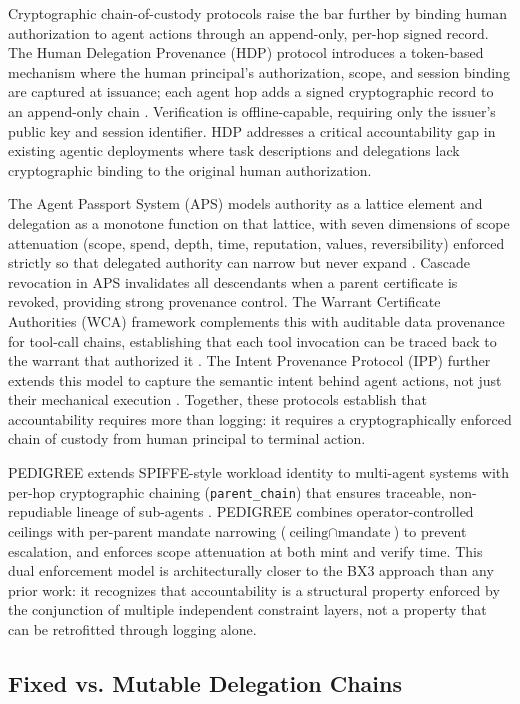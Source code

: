 Cryptographic chain-of-custody protocols raise the bar further by binding human authorization to agent actions through an append-only, per-hop signed record. The Human Delegation Provenance (HDP) protocol introduces a token-based mechanism where the human principal's authorization, scope, and session binding are captured at issuance; each agent hop adds a signed cryptographic record to an append-only chain \cite{hdp2026}. Verification is offline-capable, requiring only the issuer's public key and session identifier. HDP addresses a critical accountability gap in existing agentic deployments where task descriptions and delegations lack cryptographic binding to the original human authorization.

The Agent Passport System (APS) models authority as a lattice element and delegation as a monotone function on that lattice, with seven dimensions of scope attenuation (scope, spend, depth, time, reputation, values, reversibility) enforced strictly so that delegated authority can narrow but never expand \cite{aps2025}. Cascade revocation in APS invalidates all descendants when a parent certificate is revoked, providing strong provenance control. The Warrant Certificate Authorities (WCA) framework complements this with auditable data provenance for tool-call chains, establishing that each tool invocation can be traced back to the warrant that authorized it \cite{wca2025}. The Intent Provenance Protocol (IPP) further extends this model to capture the semantic intent behind agent actions, not just their mechanical execution \cite{ipp2026}. Together, these protocols establish that accountability requires more than logging: it requires a cryptographically enforced chain of custody from human principal to terminal action.

PEDIGREE extends SPIFFE-style workload identity to multi-agent systems with per-hop cryptographic chaining (\texttt{parent\_chain}) that ensures traceable, non-repudiable lineage of sub-agents \cite{pedigree}. PEDIGREE combines operator-controlled ceilings with per-parent mandate narrowing ($\text{ceiling} \cap \text{mandate}$) to prevent escalation, and enforces scope attenuation at both mint and verify time. This dual enforcement model is architecturally closer to the BX3 approach than any prior work: it recognizes that accountability is a structural property enforced by the conjunction of multiple independent constraint layers, not a property that can be retrofitted through logging alone.

\subsection{Fixed vs. Mutable Delegation Chains}
\label{sec:fixed-vs-mutable}

